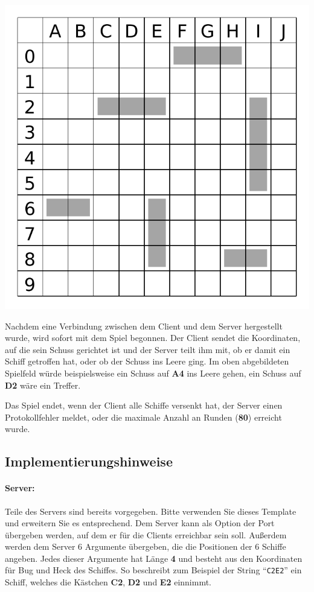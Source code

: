{\centering
\includegraphics[scale=0.55]{map.pdf} \par
}

Nachdem eine Verbindung zwischen dem Client und dem Server hergestellt wurde,
wird sofort mit dem Spiel begonnen.
Der Client sendet die Koordinaten, auf die sein Schuss gerichtet ist
und der Server teilt ihm mit, ob er damit ein Schiff getroffen hat,
oder ob der Schuss ins Leere ging.
Im oben abgebildeten Spielfeld würde beispielsweise ein Schuss auf \textbf{A4} ins Leere gehen,
ein Schuss auf \textbf{D2} wäre ein Treffer.

Das Spiel endet, wenn der Client alle Schiffe versenkt hat, der Server einen
Protokollfehler meldet, oder die maximale Anzahl an Runden (\textbf{80})
erreicht wurde.

\subsection*{Implementierungshinweise}
\label{sec:implhints}
\paragraph{Server:}
Teile des Servers sind bereits vorgegeben. Bitte verwenden Sie dieses Template
und erweitern Sie es entsprechend.  Dem Server kann als Option der Port
übergeben werden, auf dem er für die Clients erreichbar sein soll.
Außerdem werden dem Server 6 Argumente übergeben, die die Positionen der 6 Schiffe angeben.
Jedes dieser Argumente hat Länge \textbf{4} und besteht aus den Koordinaten für Bug und Heck des Schiffes.
So beschreibt zum Beispiel der String ``\verb|C2E2|''
ein Schiff, welches die Kästchen \textbf{C2}, \textbf{D2} und \textbf{E2} einnimmt.


